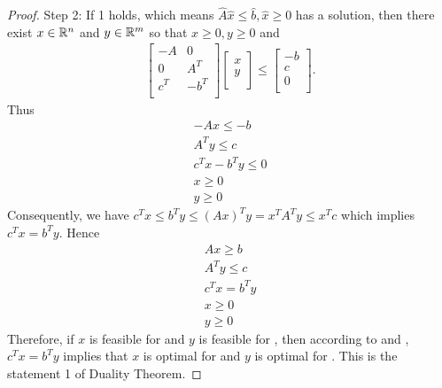 \begin{proof}
Step 2:
If 1 holds, which means $\hat{A} \hat{x} \le \hat{b}, \hat{x} \ge 0$ has a solution, then there exist $x \in \mathbb{R}^n$ and $y \in \mathbb{R}^m$ so that $x \ge 0, y \ge 0$ and 
\begin{align}
\begin{bmatrix}
-A & 0 \\
0  & A^T \\
c^T & -b^T \\
\end{bmatrix}
\begin{bmatrix}
x \\
y \\
\end{bmatrix}
\le 
\begin{bmatrix}
-b \\
c  \\
0 \\
\end{bmatrix}.
\end{align}
Thus 
\begin{align}
-A x \le -b \\
A^T y \le c \\
c^T x - b^T y \le 0 \\
x \ge 0 \\
y \ge 0
\end{align}
Consequently, we have $c^T x \le b^T y \le (Ax)^T y = x^T A^T y \le x^T c$ which implies $c^T x = b^T y$.
Hence
\begin{align}
A x \ge b \\
A^T y \le c \\
c^T x = b^T y  \\
x \ge 0 \\
y \ge 0
\end{align}
Therefore, if $x$ is feasible for  and $y$ is feasible for , then according to  and , $c^T x = b^T y$ implies that $x$ is optimal for  and $y$ is optimal for .
This is the statement 1 of Duality Theorem.


\end{proof}
